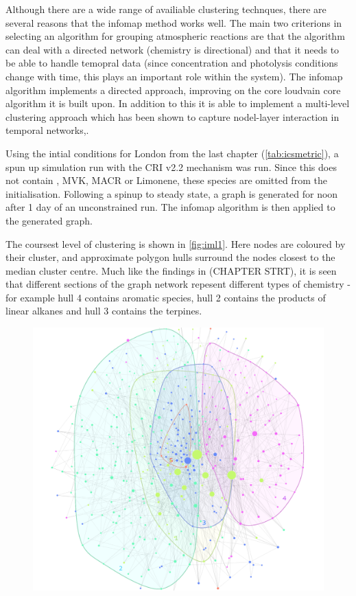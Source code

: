 Although there are a wide range of availiable clustering technques, there are several reasons that the infomap method works well. The main two criterions in selecting an algorithm for grouping atmospheric reactions are that the algorithm can deal with a directed network (chemistry is directional) and that it needs to be able to handle temopral data (since concentration and photolysis conditions change with time, this plays an important role within the system). The infomap algorithm implements a directed approach, improving on the core loudvain core algorithm it is built upon. In addition to this it is able to implement a multi-level clustering approach which has been shown to capture nodel-layer interaction in temporal networks,\citep{infointermittent}.

Using the intial conditions for London from the last chapter (\autoref{tab:icsmetric}), a spun up simulation run with the CRI v2.2 mechanism was run. Since this does not contain , MVK, MACR or Limonene, these species are omitted from the initialisation. Following a spinup to steady state, a graph is generated for noon after 1 day of an unconstrained run. The infomap algorithm is then applied to the generated graph.

The coursest level of clustering is shown in \autoref{fig:iml1}. Here nodes are coloured by their cluster, and approximate polygon hulls surround the nodes closest to the median cluster centre. Much like the findings in (CHAPTER STRT), it is seen that different sections of the graph network repesent different types of chemistry - for example hull 4 contains aromatic species, hull 2 contains the products of linear alkanes and hull 3 contains the terpines.


\begin{figure}[H]
  \centering
  \includegraphics[width=\textwidth]{fig/crigroups.png}
  \caption{\textbf{}}
    \label{fig:iml1}
\end{figure}

